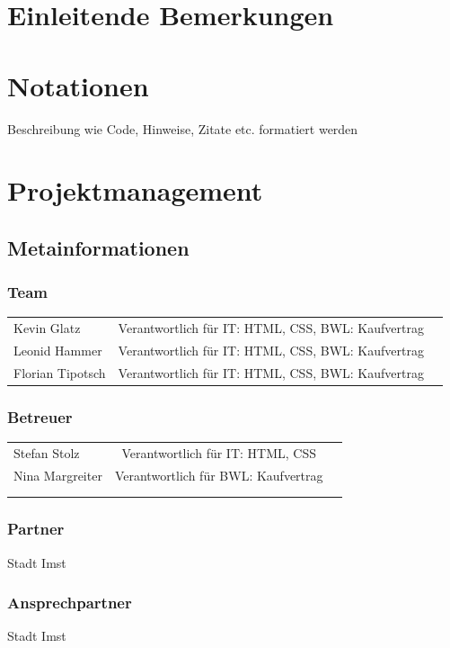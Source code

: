 \def \currentAuthor {Gabi Sorglos} %

\chapter*{Einleitende Bemerkungen}

\chapter*{Notationen}
Beschreibung wie Code, Hinweise, Zitate etc. formatiert werden  

\chapter{Projektmanagement}

\section{Metainformationen}
\subsection{Team}
\begin{tabular}{l c r}\\
	Kevin Glatz & Verantwortlich für IT: HTML, CSS, BWL: Kaufvertrag \\
	Leonid Hammer & Verantwortlich für IT: HTML, CSS, BWL: Kaufvertrag \\
	Florian Tipotsch & Verantwortlich für IT: HTML, CSS, BWL: Kaufvertrag\\	
\end{tabular}
\subsection{Betreuer}
\begin{tabular}{ l c r }
	Stefan Stolz & Verantwortlich für IT: HTML, CSS \\
	Nina Margreiter & Verantwortlich für BWL: Kaufvertrag \\
	\\\\
\end{tabular}
\subsection{Partner}
	Stadt Imst
\subsection{Ansprechpartner}
	Stadt Imst
